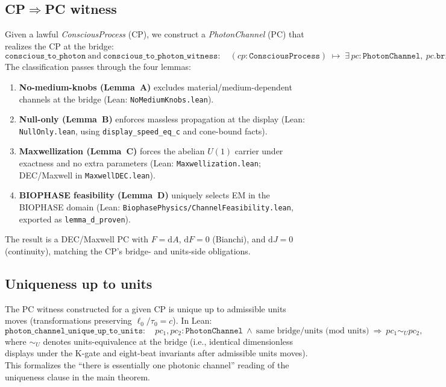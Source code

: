 \documentclass[12pt,a4paper]{article}
\begin{document}
\subsection{CP\texorpdfstring{$\Rightarrow$}{⇒}PC witness}
Given a lawful \emph{ConsciousProcess} (CP), we construct a \emph{PhotonChannel} (PC) that realizes the CP at the bridge:
\[
  \texttt{conscious\_to\_photon} \ \text{and}\ 
  \texttt{conscious\_to\_photon\_witness} :
  \quad
  (cp:\texttt{ConsciousProcess}) \;\mapsto\; \exists\,pc:\texttt{PhotonChannel},\ 
  pc.\texttt{bridge}=cp.\texttt{bridge}\ \wedge\ pc.\texttt{units}=cp.\texttt{units}\ \wedge\ \texttt{WellFormed}(pc).
\]
The classification passes through the four lemmas:
\begin{enumerate}
  \item \textbf{No-medium-knobs (Lemma~A)} excludes material/medium-dependent channels at the bridge (Lean: \texttt{NoMediumKnobs.lean}).
  \item \textbf{Null-only (Lemma~B)} enforces massless propagation at the display (Lean: \texttt{NullOnly.lean}, using \texttt{display\_speed\_eq\_c} and cone-bound facts).
  \item \textbf{Maxwellization (Lemma~C)} forces the abelian \(U(1)\) carrier under exactness and no extra parameters (Lean: \texttt{Maxwellization.lean}; DEC/Maxwell in \texttt{MaxwellDEC.lean}).
  \item \textbf{BIOPHASE feasibility (Lemma~D)} uniquely selects EM in the BIOPHASE domain (Lean: \texttt{BiophasePhysics/ChannelFeasibility.lean}, exported as \texttt{lemma\_d\_proven}).
\end{enumerate}
The result is a DEC/Maxwell PC with \(F=\mathrm{d}A\), \(\mathrm{d}F=0\) (Bianchi), and \(\mathrm{d}J=0\) (continuity), matching the CP’s bridge- and units-side obligations.

\subsection{Uniqueness up to units}
The PC witness constructed for a given CP is unique up to admissible units moves (transformations preserving \(\ell_0/\tau_0=c\)). In Lean:
\[
  \texttt{photon\_channel\_unique\_up\_to\_units} :
  \quad
  pc_1,pc_2:\texttt{PhotonChannel}\ \land\ \text{same bridge/units (mod units)}\
  \Rightarrow\ pc_1 \sim_U pc_2,
\]
where \(\sim_U\) denotes units-equivalence at the bridge (i.e., identical dimensionless displays under the K-gate and eight-beat invariants after admissible units moves). This formalizes the “there is essentially one photonic channel” reading of the uniqueness clause in the main theorem.
\end{document}
